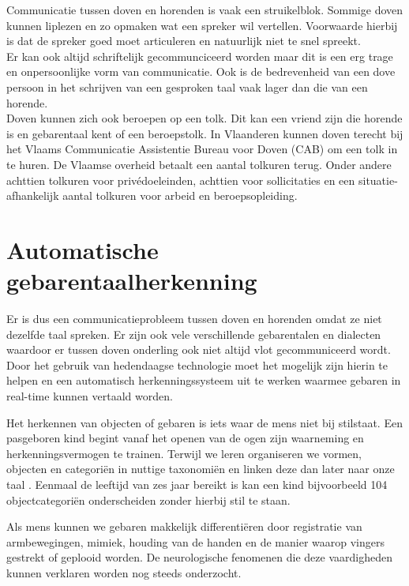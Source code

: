\npar Communicatie tussen doven en horenden is vaak een struikelblok. Sommige doven kunnen liplezen en zo opmaken wat een spreker wil vertellen. Voorwaarde hierbij is dat de spreker goed moet articuleren en natuurlijk niet te snel spreekt.
\\ Er kan ook altijd schriftelijk gecommunciceerd worden maar dit is een erg trage en onpersoonlijke vorm van communicatie. Ook is de bedrevenheid van een dove persoon in het schrijven van een gesproken taal vaak lager dan die van een horende.
\\ Doven kunnen zich ook beroepen op een tolk. Dit kan een vriend zijn die horende is en gebarentaal kent of een beroepstolk. In Vlaanderen kunnen doven terecht bij het Vlaams Communicatie Assistentie Bureau voor Doven (CAB) om een tolk in te huren. \cite{tolkuren} De Vlaamse overheid betaalt een aantal tolkuren terug. Onder andere achttien tolkuren voor priv\'edoeleinden, achttien voor sollicitaties en een situatie-afhankelijk aantal tolkuren voor arbeid en beroepsopleiding.
 
\section{Automatische gebarentaalherkenning}
Er is dus een communicatieprobleem tussen doven en horenden omdat ze niet dezelfde taal spreken. Er zijn ook vele verschillende gebarentalen en dialecten waardoor er tussen doven onderling ook niet altijd vlot gecommuniceerd wordt.
Door het gebruik van hedendaagse technologie moet het mogelijk zijn hierin te helpen en een automatisch herkenningssysteem uit te werken waarmee gebaren in real-time kunnen vertaald worden.

\npar Het herkennen van objecten of gebaren is iets waar de mens niet bij stilstaat. Een pasgeboren kind begint vanaf het openen van de ogen zijn waarneming en herkenningsvermogen te trainen. Terwijl we leren organiseren we vormen, objecten en categori\"en in nuttige taxonomi\"en en linken deze dan later naar onze taal \cite{oneshot-object-cat}. Eenmaal de leeftijd van zes jaar bereikt is kan een kind bijvoorbeeld 104 objectcategori\"en onderscheiden zonder hierbij stil te staan.

\npar Als mens kunnen we gebaren makkelijk differenti\"eren door registratie van armbewegingen, mimiek, houding van de handen en de manier waarop vingers gestrekt of geplooid worden. De neurologische fenomenen die deze vaardigheden kunnen verklaren worden nog steeds onderzocht. 

